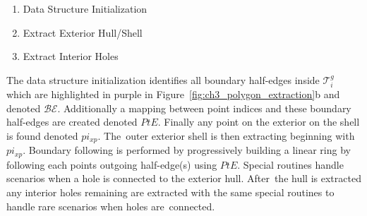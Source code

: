 \begin{enumerate}
    \item Data Structure Initialization
    \item Extract Exterior Hull/Shell
    \item Extract Interior Holes
\end{enumerate}

The data structure initialization identifies all boundary half-edges inside $\mathcal{T}^{g}_i$ which are highlighted in purple in Figure~\ref{fig:ch3_polygon_extraction}b and denoted $\mathcal{BE}$. Additionally a mapping between point indices and these boundary half-edges are created denoted $PtE$. Finally any point on the exterior on the shell is found denoted $pi_{xp}$. The~outer exterior shell is then extracting beginning with $pi_{xp}$. Boundary following is performed by progressively building a linear ring by following each points outgoing half-edge(s) using $PtE$. Special routines handle scenarios when a hole is connected to the exterior hull. After~the hull is extracted any interior holes remaining are extracted with the same special routines to handle rare scenarios when holes are~connected.


